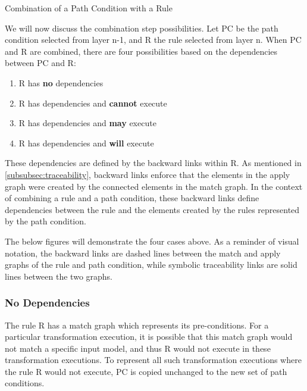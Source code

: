 \begin{definition}{Combination of a Path Condition with a Rule}
\label{def:combine_pc_with_rule}

\end{definition}


We will now discuss the combination step possibilities. Let PC be the path condition selected from layer n-1, and R the rule selected from layer n. When PC and R are combined, there are four possibilities based on the dependencies between PC and R:

\begin{enumerate}
\item R has \textbf{no} dependencies
\item R has dependencies and \textbf{cannot} execute
\item R has dependencies and \textbf{may} execute
\item R has dependencies and \textbf{will} execute
\end{enumerate}

These dependencies are defined by the backward links within R. As mentioned in \cref{subsubsec:traceability}, backward links enforce that the elements in the apply graph were created by the connected elements in the match graph. In the context of combining a rule and a path condition, these backward links define dependencies between the rule and the elements created by the rules represented by the path condition. 

The below figures will demonstrate the four cases above. As a reminder of visual notation, the backward links are dashed lines between the match and apply graphs of the rule and path condition, while symbolic traceability links are solid lines between the two graphs.

\subsubsection{No Dependencies}
\label{enum:no_back}

The rule R has a match graph which represents its pre-conditions. For a particular transformation execution, it is possible that this match graph would not match a specific input model, and thus R would not execute in these transformation executions. To represent all such transformation executions where the rule R would not execute, PC is copied unchanged to the new set of path conditions.

